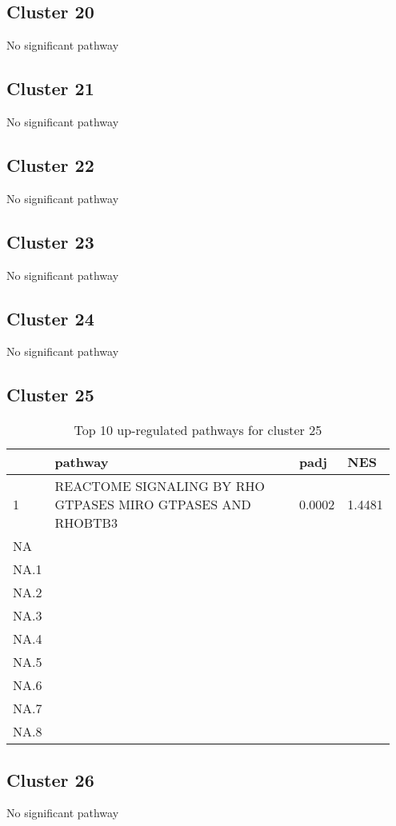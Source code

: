 \documentclass{article}
\begin{document}
\subsection{Cluster 20 }
No significant pathway
\subsection{Cluster 21 }
No significant pathway
\subsection{Cluster 22 }
No significant pathway
\subsection{Cluster 23 }
No significant pathway
\subsection{Cluster 24 }
No significant pathway
\subsection{Cluster 25 }
\begin{table}[H]
\centering
\begin{tabular}{p{0.05\linewidth}p{0.7\linewidth}p{0.1\linewidth}p{0.1\linewidth}}
  \hline
 & pathway & padj & NES \\ 
  \hline
1 & REACTOME SIGNALING BY RHO GTPASES MIRO GTPASES AND RHOBTB3 & 0.0002 & 1.4481 \\ 
  NA &  &  &  \\ 
  NA.1 &  &  &  \\ 
  NA.2 &  &  &  \\ 
  NA.3 &  &  &  \\ 
  NA.4 &  &  &  \\ 
  NA.5 &  &  &  \\ 
  NA.6 &  &  &  \\ 
  NA.7 &  &  &  \\ 
  NA.8 &  &  &  \\ 
   \hline
\end{tabular}
\caption{Top 10 up-regulated pathways for cluster 25} 
\label{tab:q3_2_25}
\end{table}
\subsection{Cluster 26 }
No significant pathway
\end{document}
